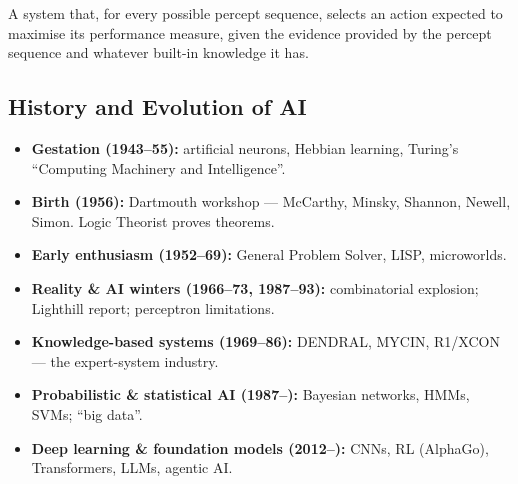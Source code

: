 \begin{definition}
A system that, for every possible percept sequence, selects an action expected to maximise its performance measure, given the evidence provided by the percept sequence and whatever built-in knowledge it has.
\end{definition}

\subsection{History and Evolution of AI}
\begin{center}
\end{center}
\begin{itemize}
\item \textbf{Gestation (1943--55):} artificial neurons, Hebbian learning, Turing's ``Computing Machinery and Intelligence''.
\item \textbf{Birth (1956):} Dartmouth workshop --- McCarthy, Minsky, Shannon, Newell, Simon. Logic Theorist proves theorems.
\item \textbf{Early enthusiasm (1952--69):} General Problem Solver, LISP, microworlds.
\item \textbf{Reality \& AI winters (1966--73, 1987--93):} combinatorial explosion; Lighthill report; perceptron limitations.
\item \textbf{Knowledge-based systems (1969--86):} DENDRAL, MYCIN, R1/XCON --- the expert-system industry.
\item \textbf{Probabilistic \& statistical AI (1987--):} Bayesian networks, HMMs, SVMs; ``big data''.
\item \textbf{Deep learning \& foundation models (2012--):} CNNs, RL (AlphaGo), Transformers, LLMs, agentic AI.
\end{itemize}

